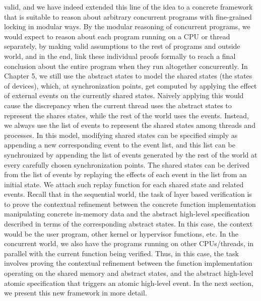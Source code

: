 valid, and we have indeed extended this line of the idea to a concrete framework that is suitable to reason about arbitrary concurrent programs with fine-grained locking in modular ways. By the modular reasoning of concurrent programs, we would expect to reason about each program running on a CPU or thread separately, by making valid assumptions to the rest of programs and outside world, and in the end, link these individual proofs formally to reach a final conclusion about the entire program when they run altogether concurrently. In Chapter 5, we still use the abstract states to model the shared states (the states of devices), which, at synchronization points, get computed by applying the effect of external events on the currently shared states. Naively applying this would cause the discrepancy when the current thread uses the abstract states to represent the shares states, while the rest of the world uses the events. Instead, we always use the list of events to represent the shared states among threads and processes. In this model, modifying shared states can be specified simply as appending a new corresponding event to the event list, and this list can be synchronized by appending the list of events generated by the rest of the world at every carefully chosen synchronization points. The shared states can be derived from the list of events by replaying the effects of each event in the list from an initial state. We attach such replay function for each shared state and related events.
Recall that in the sequential world, the task of layer based verification is to prove the contextual refinement between the concrete function implementation manipulating concrete in-memory data and the abstract high-level specification described in terms of the corresponding abstract states. In this case, the context would be the user program, other kernel or hypervisor functions, etc. In the concurrent world, we also have the programs running on other CPUs/threads, in parallel with the current function being verified. Thus, in this case, the task involves proving the contextual refinement between the function implementation operating on the shared memory and abstract states, and the abstract high-level atomic specification that triggers an atomic high-level event. In the next section, we present this new framework in more detail.